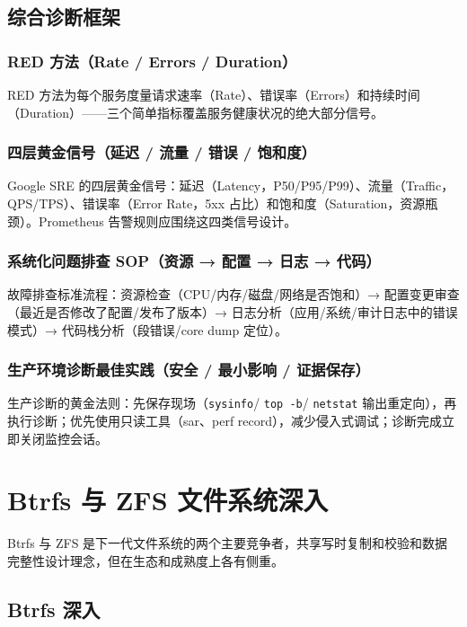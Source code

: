 \documentclass[12pt,UTF8]{ctexbook}
\begin{document}
  \section{综合诊断框架}
    \subsection{RED 方法（Rate / Errors / Duration）}

RED 方法为每个服务度量请求速率（Rate）、错误率（Errors）和持续时间（Duration）——三个简单指标覆盖服务健康状况的绝大部分信号。

    \subsection{四层黄金信号（延迟 / 流量 / 错误 / 饱和度）}

Google SRE 的四层黄金信号：延迟（Latency，P50/P95/P99）、流量（Traffic，QPS/TPS）、错误率（Error Rate，5xx 占比）和饱和度（Saturation，资源瓶颈）。Prometheus 告警规则应围绕这四类信号设计。

    \subsection{系统化问题排查 SOP（资源 → 配置 → 日志 → 代码）}

故障排查标准流程：资源检查（CPU/内存/磁盘/网络是否饱和）→ 配置变更审查（最近是否修改了配置/发布了版本）→ 日志分析（应用/系统/审计日志中的错误模式）→ 代码栈分析（段错误/core dump 定位）。

    \subsection{生产环境诊断最佳实践（安全 / 最小影响 / 证据保存）}

生产诊断的黄金法则：先保存现场（\verb|sysinfo|/ \verb|top -b|/ \verb|netstat| 输出重定向），再执行诊断；优先使用只读工具（sar、perf record），减少侵入式调试；诊断完成立即关闭监控会话。


\chapter{Btrfs 与 ZFS 文件系统深入}
\label{chap:btrfs-zfs-deep}

Btrfs 与 ZFS 是下一代文件系统的两个主要竞争者，共享写时复制和校验和数据完整性设计理念，但在生态和成熟度上各有侧重。

  \section{Btrfs 深入}
\end{document}
